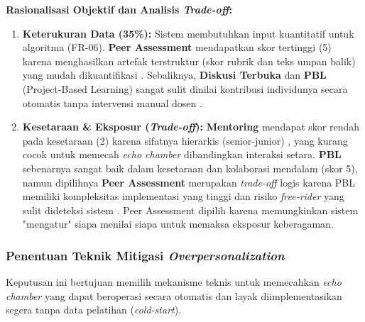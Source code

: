\textbf{Rasionalisasi Objektif dan Analisis \textit{Trade-off}:}
\begin{enumerate}
    \item \textbf{Keterukuran Data (35\%):} Sistem membutuhkan input kuantitatif untuk algoritma (FR-06). \textbf{Peer Assessment} mendapatkan skor tertinggi (5) karena menghasilkan artefak terstruktur (skor rubrik dan teks umpan balik) yang mudah dikuantifikasi \autocite{Ihichr2024}. Sebaliknya, \textbf{Diskusi Terbuka} dan \textbf{PBL} (Project-Based Learning) sangat sulit dinilai kontribusi individunya secara otomatis tanpa intervensi manual dosen \autocite{Ryoo2021}.
    
    \item \textbf{Kesetaraan \& Eksposur (\textit{Trade-off}):} \textbf{Mentoring} mendapat skor rendah pada kesetaraan (2) karena sifatnya hierarkis (senior-junior) \autocite{Le2024}, yang kurang cocok untuk memecah \textit{echo chamber} dibandingkan interaksi setara. \textbf{PBL} sebenarnya sangat baik dalam kesetaraan dan kolaborasi mendalam (skor 5), namun dipilihnya \textbf{Peer Assessment} merupakan \textit{trade-off} logis karena PBL memiliki kompleksitas implementasi yang tinggi dan risiko \textit{free-rider} yang sulit dideteksi sistem \autocite{Zhang2023}. Peer Assessment dipilih karena memungkinkan sistem "mengatur" siapa menilai siapa untuk memaksa eksposur keberagaman.
\end{enumerate}

\subsubsection{Penentuan Teknik Mitigasi \textit{Overpersonalization}}
\label{sssec:keputusan_mitigasi_bubble}
Keputusan ini bertujuan memilih mekanisme teknis untuk memecahkan \textit{echo chamber} yang dapat beroperasi secara otomatis dan layak diimplementasikan segera tanpa data pelatihan (\textit{cold-start}).



